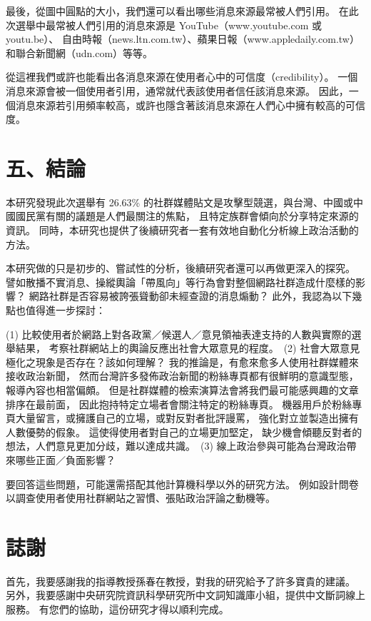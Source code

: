 \documentclass[a4paper, 10pt, conference]{ieeeconf}       %
\begin{document}
\begin{CJK}{UTF8}{bsmi}
最後，從圖中圓點的大小，我們還可以看出哪些消息來源最常被人們引用。%
在此次選舉中最常被人們引用的消息來源是 YouTube（www.youtube.com 或 youtu.be）、%
自由時報（news.ltn.com.tw）、蘋果日報（www.appledaily.com.tw）和聯合新聞網（udn.com）等等。%

從這裡我們或許也能看出各消息來源在使用者心中的可信度（credibility）。%
一個消息來源會被一個使用者引用，通常就代表該使用者信任該消息來源。%
因此，一個消息來源若引用頻率較高，或許也隱含著該消息來源在人們心中擁有較高的可信度。%

\section*{五、結論}

本研究發現此次選舉有 26.63\% 的社群媒體貼文是攻擊型競選，與台灣、中國或中國國民黨有關的議題是人們最關注的焦點，%
且特定族群會傾向於分享特定來源的資訊。%
同時，本研究也提供了後續研究者一套有效地自動化分析線上政治活動的方法。%

本研究做的只是初步的、嘗試性的分析，後續研究者還可以再做更深入的探究。%
譬如散播不實消息、操縱輿論「帶風向」等行為會對整個網路社群造成什麼樣的影響？%
網路社群是否容易被誇張聳動卻未經查證的消息煽動？%
此外，我認為以下幾點也值得進一步探討：%

(1) 比較使用者於網路上對各政黨／候選人／意見領袖表達支持的人數與實際的選舉結果，%
考察社群網站上的輿論反應出社會大眾意見的程度。%
\,(2) 社會大眾意見極化之現象是否存在？該如何理解？%
我的推論是，有愈來愈多人使用社群媒體來接收政治新聞，%
然而台灣許多發佈政治新聞的粉絲專頁都有很鮮明的意識型態，報導內容也相當偏頗。%
但是社群媒體的檢索演算法會將我們最可能感興趣的文章排序在最前面，%
因此抱持特定立場者會關注特定的粉絲專頁。%
機器用戶於粉絲專頁大量留言，或擁護自己的立場，或對反對者批評謾罵，%
強化對立並製造出擁有人數優勢的假象。%
這使得使用者對自己的立場更加堅定，%
缺少機會傾聽反對者的想法，人們意見更加分歧，難以達成共識。%
\,(3) 線上政治參與可能為台灣政治帶來哪些正面／負面影響？%

要回答這些問題，可能還需搭配其他計算機科學以外的研究方法。%
例如設計問卷以調查使用者使用社群網站之習慣、張貼政治評論之動機等。%


\section*{誌謝}

首先，我要感謝我的指導教授孫春在教授，對我的研究給予了許多寶貴的建議。%
另外，我要感謝中央研究院資訊科學研究所中文詞知識庫小組，提供中文斷詞線上服務。%
有您們的協助，這份研究才得以順利完成。%





\end{CJK}
\end{document}
